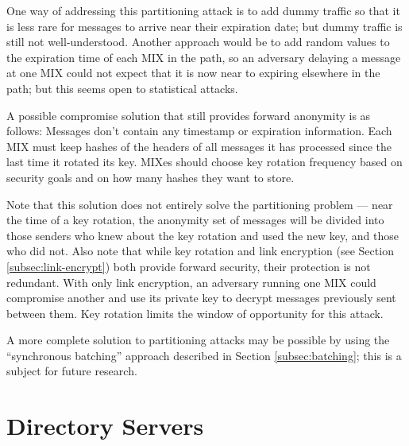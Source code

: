 \documentclass{llncs}
\begin{document}
One way of addressing this partitioning attack is to add dummy traffic
so that it is less rare for messages to arrive near their expiration date;
but dummy traffic is still not well-understood. Another approach would
be to add random values to the expiration time of each MIX in the path,
so an adversary delaying a message at one MIX could not expect that it
is now near to expiring elsewhere in the path; but this seems open to
statistical attacks.


A possible compromise solution that still provides forward anonymity
is as follows:  Messages don't
contain any timestamp or expiration information. Each MIX must keep
hashes of the headers of all messages it has processed since the last time
it rotated its key. MIXes should choose key rotation frequency based on
security goals and on how many hashes they want to store.

Note that this solution does not entirely solve the partitioning problem
--- near the time of a key rotation, the anonymity set of messages will
be divided into those senders who knew about the key rotation and used
the new key, and those who did not.
Also note that while key rotation and link encryption (see Section
\ref{subsec:link-encrypt}) both provide forward security, their protection
is not redundant. With only link encryption, an adversary running
one MIX could compromise another and use its private key to decrypt
messages previously sent between them. Key rotation limits the window
of opportunity for this attack.

A more complete solution to partitioning attacks may be possible by
using the ``synchronous batching'' approach described in
Section \ref{subsec:batching}; this is a subject for future research.


\section{Directory Servers}
\label{sec:dir-servers}
\end{document}

